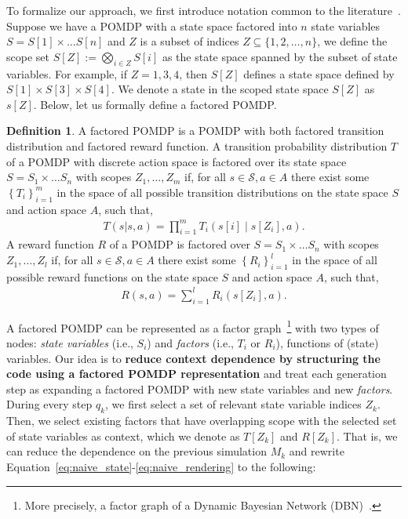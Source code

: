 \documentclass{article}
\theoremstyle{plain}
\theoremstyle{definition}
\newtheorem{definition}[theorem]{Definition}
\theoremstyle{remark}
\begin{document}
To formalize our approach, we first introduce notation common to the literature~\cite{osband2014near,szita2009optimistic}.
Suppose we have a POMDP with a state space factored into $n$ state variables $S = S[1] \times \ldots S[n]$ and $Z$ is a subset of indices \( Z \subseteq \{1, 2, \ldots, n\} \), we define the scope set \(S[Z] := \bigotimes_{i \in Z} S[i] \) as the state space spanned by the subset of state variables. For example, if $Z = {1, 3, 4}$, then $S[Z]$ defines a state space defined by $S[1] \times S[3] \times S[4]$. We denote a state in the scoped state space $S[Z]$ as $s[Z]$. Below, let us formally define a factored POMDP.
\begin{definition}
A factored POMDP is a POMDP with both factored transition distribution and factored reward function. A transition probability distribution $T$ of a POMDP with discrete action space is factored over its state space $S = S_{1} \times \ldots S_{n}$ with scopes $Z_{1}, \ldots, Z_{m}$ if, for all $s \in \mathcal{S}, a \in A$ there exist some $\left\{T_{i} \right\}_{i=1}^{m}$ in the space of all possible transition distributions on the state space $S$ and action space $A$, such that,
\begin{align} \label{eq:factor}
      T(s | s, a)=\prod_{i=1}^{m} T_{i}\left(s[i] \mid s\left[Z_{i}\right], a\right).
\end{align}
A reward function $R$ of a POMDP is factored over $S = S_{1} \times \ldots S_{n}$ with scopes $Z_{1}, \ldots, Z_{l}$ if, for all $s \in \mathcal{S}, a \in A$ there exist some $\left\{R_{i} \right\}_{i=1}^{l}$ in the space of all possible reward functions on the state space $S$ and action space $A$, such that,
\begin{align}
    R(s, a)=\sum_{i=1}^{l} R_{i}\left( s\left[Z_{i}\right], a\right).
\end{align}
\end{definition}
A factored POMDP can be represented as a factor graph~\footnote{More precisely, a factor graph of a Dynamic Bayesian Network (DBN)~\cite{hansen2000dynamic,boutilier1996computing}.} with two types of nodes: \textit{state variables} (i.e., $S_i$) and \textit{factors} (i.e., $T_i$ or $R_i$), functions of (state) variables. Our idea is to \textbf{reduce context dependence by structuring the code using a factored POMDP representation} and treat each generation step as expanding a factored POMDP with new state variables and new \textit{factors}. During every step $q_k$, we first select a set of relevant state variable indices $Z_k$. Then, we select existing factors that have overlapping scope with the selected set of state variables as context, which we denote as $T[Z_{k}]$ and $R[Z_{k}]$. That is, we can reduce the dependence on the previous simulation $M_k$ and rewrite Equation~\ref{eq:naive_state}-\ref{eq:naive_rendering} to the following:
\end{document}
